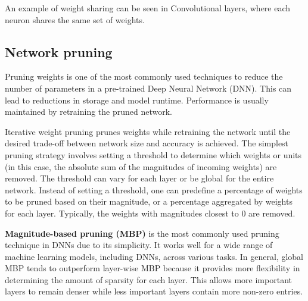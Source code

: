 An example of weight sharing can be seen in Convolutional layers, where each
neuron shares the same set of weights.

\subsection{Network pruning}
Pruning weights is one of the most commonly used techniques to reduce the number
of parameters in a pre-trained Deep Neural Network (DNN). This can lead to
reductions in storage and model runtime. Performance is usually maintained by
retraining the pruned network.

Iterative weight pruning prunes weights while retraining the network until the
desired trade-off between network size and accuracy is achieved. The simplest
pruning strategy involves setting a threshold to determine which weights or units
(in this case, the absolute sum of the magnitudes of incoming weights) are
removed. The threshold can vary for each layer or be global for the entire network.
Instead of setting a threshold, one can predefine a percentage of weights to be
pruned based on their magnitude, or a percentage aggregated by weights for each
layer. Typically, the weights with magnitudes closest to 0 are removed.

\textbf{Magnitude-based pruning (MBP)} is the most commonly used pruning technique
in DNNs due to its simplicity. It works well for a wide range of machine learning
models, including DNNs, across various tasks. In general, global MBP tends to
outperform layer-wise MBP because it provides more flexibility in determining
the amount of sparsity for each layer. This allows more important layers to remain
denser while less important layers contain more non-zero entries.


